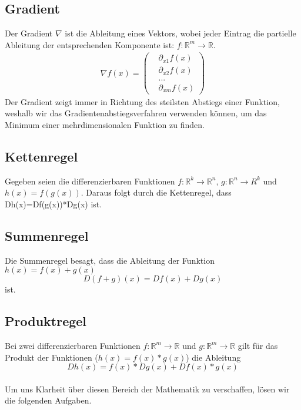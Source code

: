 \subsection{Gradient}
Der Gradient $\nabla$ ist die Ableitung eines Vektors, wobei jeder Eintrag die partielle Ableitung der entsprechenden Komponente ist:
$f:\mathds{R}^m\rightarrow\mathds{R}$.
\begin{equation} \begin{split} \nabla f(x) = \left( \begin{array}{c}
& \partial_{x1} f(x) \\ & \partial_{x2} f(x) \\ & ... \\ & \partial_{xm} f(x)
\end{array}
\right)
\end{split} \end{equation} 
Der Gradient zeigt immer in Richtung des steilsten Abstiegs einer Funktion, weshalb wir das Gradientenabstiegsverfahren verwenden können, um das Minimum einer mehrdimensionalen Funktion zu finden.
\subsection{Kettenregel}
Gegeben seien die differenzierbaren Funktionen $f:\mathds{R}^k\rightarrow\mathds{R}^n$, $g:\mathds{R}^n\rightarrow{R}^k$ und $h(x)=f(g(x))$. Daraus folgt durch die Kettenregel, dass Dh(x)=Df(g(x))*Dg(x) ist.
\subsection{Summenregel}
Die Summenregel besagt, dass die Ableitung der Funktion $h(x)=f(x)+g(x)$ \begin{equation*} D(f + g)(x)=Df(x)+Dg(x)\end{equation*} ist.
\subsection {Produktregel}
Bei zwei differenzierbaren Funktionen $f:\mathds{R}^m\rightarrow\mathds{R}$ und $g:\mathds{R}^m\rightarrow\mathds{R}$ gilt für das Produkt der Funktionen ($h(x)=f(x)*g(x)$) die Ableitung \begin{equation*}Dh(x)=f(x)*Dg(x)+Df(x)*g(x)\end{equation*}
\\
Um uns Klarheit über diesen Bereich der Mathematik zu verschaffen, l\"osen wir die folgenden Aufgaben.
\vspace{15pt}

